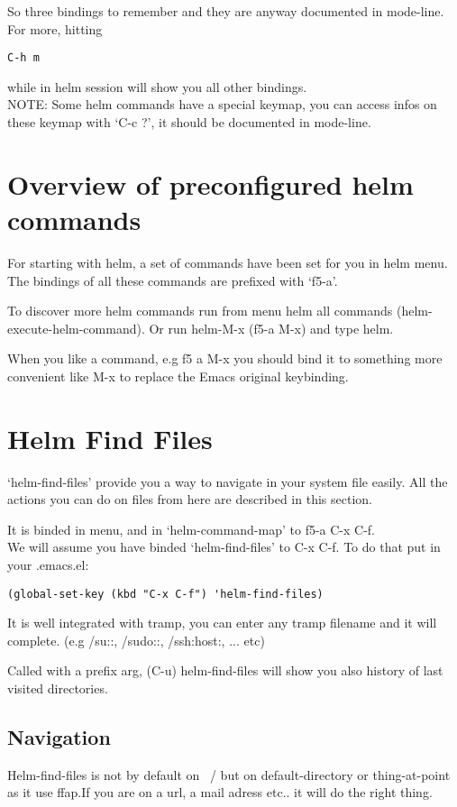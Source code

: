 \documentclass[a4paper,11pt]{article}
\begin{document}
So three bindings to remember and they are anyway documented in mode-line.
For more, hitting
\begin{verbatim}
C-h m
\end{verbatim}
while in helm session will show you all other bindings.\\
NOTE: Some helm commands have a special keymap, you can access infos on these keymap with `C-c ?',
it should be documented in mode-line.

\section{Overview of preconfigured helm commands}
\label{sec:overv-comm-avail}
For starting with helm, a set of commands have been set for you in helm menu.
The bindings of all these commands are prefixed with `f5-a'.

To discover more helm commands run from menu helm all commands (helm-execute-helm-command).
Or run helm-M-x (f5-a M-x) and type helm.

When you like a command, e.g f5 a M-x you should bind it to something more convenient like M-x to replace the Emacs
original keybinding.

\section{Helm Find Files}
\label{sec:helm-find-files}
`helm-find-files' provide you a way to navigate in your system file easily.
All the actions you can do on files from here are described in this section.

It is binded in menu, and in `helm-command-map' to f5-a C-x C-f. \\
We will assume you have binded `helm-find-files' to C-x C-f.
To do that put in your .emacs.el:
\begin{verbatim}
(global-set-key (kbd "C-x C-f") 'helm-find-files)
\end{verbatim}
It is well integrated with tramp, you can enter any tramp filename and it will complete.
(e.g /su::, /sudo::, /ssh:host:, ... etc)

Called with a prefix arg, (C-u) helm-find-files will show you also history of last visited directories.

\subsection{Navigation}
\label{sec:navigation}
Helm-find-files is not by default on ~/ but on default-directory or
thing-at-point as it use ffap.If you are on a url, a mail adress
etc.. it will do the right thing.
\end{document}
